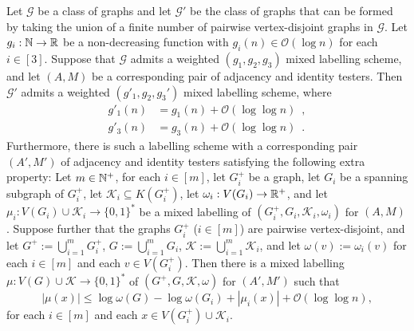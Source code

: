 \documentclass{patmorin}
\renewcommand{\le}{\leqslant}
\newcommand{\pat}[1]{\textcolor{Magenta}{PaMo: #1}}
\newcommand{\gwen}[1]{\textcolor{Purple}{GJ: #1}}
\newcommand{\Oh}{\calO}
\newcommand{\calG}{\mathcal{G}}
\newcommand{\calK}{\mathcal{K}}
\newcommand{\calO}{\mathcal{O}}
\begin{document}


\begin{lem}\label{disjoint_union_iii}
   Let $\calG$ be a class of graphs and let $\calG'$ be the class of graphs that can be formed by taking the union of a finite number of pairwise vertex-disjoint graphs in $\calG$. 
    Let $g_i:\mathbb{N}\to\mathbb{R}$ be a non-decreasing function  with $g_i(n)\in \Oh(\log n)$ for each $i\in[3]$.    
    Suppose that $\calG$ admits a weighted $(g_1,g_2,g_3)$ mixed labelling scheme, and let $(A, M)$ be a corresponding pair of adjacency and identity testers. 
    Then $\calG'$ admits a weighted $(g'_1,g_2,g_3')$ mixed labelling scheme, where
    \begin{align*}
        g'_1(n) & = g_1(n)+\Oh(\log\log n)\enspace, \\
        g'_3(n) & = g_3(n)+\Oh(\log\log n) \enspace .
    \end{align*}
    Furthermore, there is such a labelling scheme with a corresponding pair $(A', M')$ of adjacency and identity testers satisfying the following extra property:  
    Let $m\in\mathbb{N}^+$, for each $i\in[m]$, let $G^+_i$ be a graph, let $G_i$ be a spanning subgraph of $G^+_i$, let $\calK_i\subseteq K(G^+_i)$, 
    let $\omega_i:V(G_i)\to\mathbb{R}^+$, and let $\mu_i:V(G_i)\cup\calK_i\to\{0,1\}^*$ be a mixed labelling of $(G^+_i,G_i,\calK_i,\omega_i)$ for $(A, M)$. 
    Suppose further that the graphs $G^+_i$ ($i\in [m]$) are pairwise vertex-disjoint, and 
    let $G^+:=\bigcup_{i=1}^m G^+_i$, $G:=\bigcup_{i=1}^m G_i$, $\calK:=\bigcup_{i=1}^m \calK_i$, and let $\omega(v):=\omega_i(v)$ for each $i\in[m]$ and each $v\in V(G^+_i)$.     
    Then there is a mixed labelling $\mu:V(G)\cup\calK\to \{0,1\}^*$ of $(G^+, G, \calK, \omega)$ for $(A', M')$ such that 
    \[
    |\mu(x)|\le \log\omega(G)-\log\omega(G_i)+ |\mu_i(x)| + \Oh(\log\log n), 
    \]
    for each $i\in [m]$ and each $x\in V(G^+_i)\cup \calK_i$.
  \end{lem}

\end{document}
